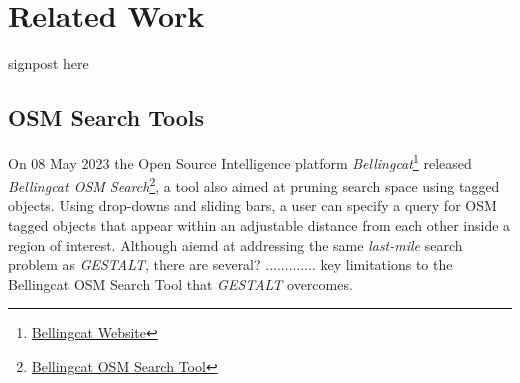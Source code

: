 \section{Related Work}
\label{section:related}

signpost here

\subsection{OSM Search Tools}
On 08 May 2023 the Open Source Intelligence platform \textit{Bellingcat}\footnote{\href{https://www.bellingcat.com/about/who-we-are/}{Bellingcat Website}} released \textit{Bellingcat OSM Search}\footnote{\href{https://osm-search.bellingcat.com/}{Bellingcat OSM Search Tool}}\cite{Williams2023}, a tool also aimed at pruning search space using tagged objects. Using drop-downs and sliding bars, a user can specify a query for OSM tagged objects that appear within an adjustable distance from each other inside a region of interest. Although aiemd at addressing the same \emph{last-mile} search problem as \emph{GESTALT}, there are several? ............. key limitations to the Bellingcat OSM Search Tool that \emph{GESTALT} overcomes.
